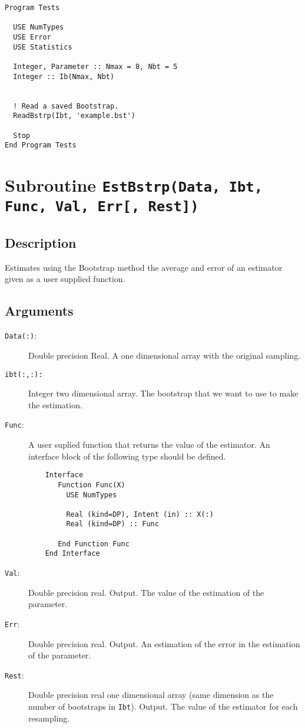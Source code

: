 \begin{lstlisting}[emph=ReadBstrp,
                   emphstyle=\color{blue},
                   frame=trBL,
                   caption=Saving the resampling info.,
                   label=ReadBstrp]
Program Tests

  USE NumTypes
  USE Error
  USE Statistics

  Integer, Parameter :: Nmax = 8, Nbt = 5
  Integer :: Ib(Nmax, Nbt)


  ! Read a saved Bootstrap.
  ReadBstrp(Ibt, 'example.bst')

  Stop
End Program Tests
\end{lstlisting}

\section{Subroutine \texttt{EstBstrp(Data, Ibt, Func, Val, Err[, Rest])}}

\subsection{Description}

Estimates using the Bootstrap method the average and error of an
estimator given as a user supplied function.

\subsection{Arguments}

\begin{description}
\item[\texttt{Data(:)}:] Double precision Real. A one dimensional
  array with the original sampling.
\item[\texttt{ibt(:,:): }] Integer two dimensional array. The bootstrap
  that we want to use to make the estimation.
\item[\texttt{Func}: ] A user suplied function that returns the value
  of the estimator. An interface block of the following type should be
  defined. 
\begin{verbatim}
    Interface 
       Function Func(X)
         USE NumTypes
         
         Real (kind=DP), Intent (in) :: X(:)
         Real (kind=DP) :: Func

       End Function Func
    End Interface
\end{verbatim}
\item[\texttt{Val}: ] Double precision real. Output. The value of the 
  estimation of the parameter. 
\item[\texttt{Err}: ] Double precision real. Output. An estimation of
  the error in the estimation of the parameter. 
\item[\texttt{Rest}: ] Double precision real one dimensional array
  (same dimension as the number of bootstraps in
  \texttt{Ibt}). Output. The value of the estimator for each
  resampling. 
\end{description}

